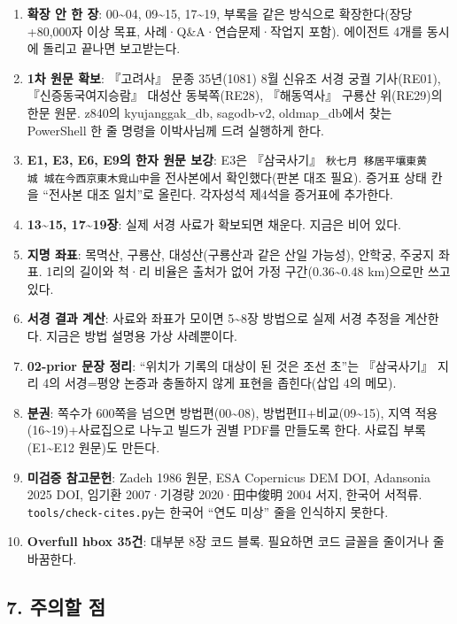 \documentclass[10pt,a4paper]{article}
\providecommand{\tightlist}{\setlength{\itemsep}{0pt}\setlength{\parskip}{0pt}}
\begin{document}
\begin{enumerate}
\def\labelenumi{\arabic{enumi}.}
\tightlist
\item
  \textbf{확장 안 한 장}: 00\textasciitilde04, 09\textasciitilde15, 17\textasciitilde19, 부록을 같은 방식으로 확장한다(장당 +80,000자 이상 목표, 사례·Q\&A·연습문제·작업지 포함). 에이전트 4개를 동시에 돌리고 끝나면 보고받는다.
\item
  \textbf{1차 원문 확보}: 『고려사』 문종 35년(1081) 8월 신유조 서경 궁궐 기사(RE01), 『신증동국여지승람』 대성산 동북쪽(RE28), 『해동역사』 구룡산 위(RE29)의 한문 원문. z840의 kyujanggak\_db, sagodb-v2, oldmap\_db에서 찾는 PowerShell 한 줄 명령을 이박사님께 드려 실행하게 한다.
\item
  \textbf{E1, E3, E6, E9의 한자 원문 보강}: E3은 『삼국사기』 \texttt{秋七月\ 移居平壤東黄城\ 城在今西京東木覓山中}을 전사본에서 확인했다(판본 대조 필요). 증거표 상태 칸을 ``전사본 대조 일치''로 올린다. 각자성석 제4석을 증거표에 추가한다.
\item
  \textbf{13\textasciitilde15, 17\textasciitilde19장}: 실제 서경 사료가 확보되면 채운다. 지금은 비어 있다.
\item
  \textbf{지명 좌표}: 목멱산, 구룡산, 대성산(구룡산과 같은 산일 가능성), 안학궁, 주궁지 좌표. 1리의 길이와 척·리 비율은 출처가 없어 가정 구간(0.36\textasciitilde0.48 km)으로만 쓰고 있다.
\item
  \textbf{서경 결과 계산}: 사료와 좌표가 모이면 5\textasciitilde8장 방법으로 실제 서경 추정을 계산한다. 지금은 방법 설명용 가상 사례뿐이다.
\item
  \textbf{02-prior 문장 정리}: ``위치가 기록의 대상이 된 것은 조선 초''는 『삼국사기』 지리 4의 서경=평양 논증과 충돌하지 않게 표현을 좁힌다(삽입 4의 메모).
\item
  \textbf{분권}: 쪽수가 600쪽을 넘으면 방법편(00\textasciitilde08), 방법편II+비교(09\textasciitilde15), 지역 적용(16\textasciitilde19)+사료집으로 나누고 빌드가 권별 PDF를 만들도록 한다. 사료집 부록(E1\textasciitilde E12 원문)도 만든다.
\item
  \textbf{미검증 참고문헌}: Zadeh 1986 원문, ESA Copernicus DEM DOI, Adansonia 2025 DOI, 임기환 2007·기경량 2020·田中俊明 2004 서지, 한국어 서적류. \texttt{tools/check-cites.py}는 한국어 ``연도 미상'' 줄을 인식하지 못한다.
\item
  \textbf{Overfull hbox 35건}: 대부분 8장 코드 블록. 필요하면 코드 글꼴을 줄이거나 줄바꿈한다.
\end{enumerate}

\hypertarget{uxc8fcuxc758uxd560-uxc810}{%
\subsection{7. 주의할 점}\label{uxc8fcuxc758uxd560-uxc810}}
\end{document}

